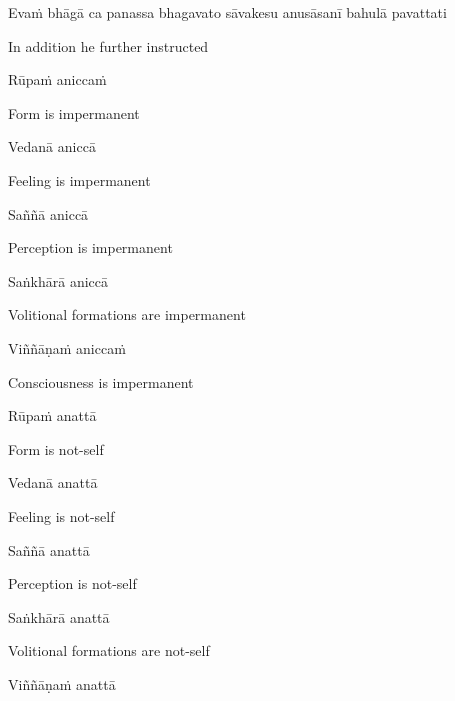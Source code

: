 Evaṁ bhāgā ca panassa bhagavato sāvakesu anusāsanī bahulā pavattati

\begin{english}
  In addition he further instructed
\end{english}

Rūpaṁ aniccaṁ

\begin{english}
  Form is impermanent
\end{english}

Vedanā aniccā

\begin{english}
  Feeling is impermanent
\end{english}

Saññā aniccā

\begin{english}
  Perception is impermanent
\end{english}

Saṅkhārā aniccā

\begin{english}
  Volitional formations are impermanent
\end{english}

Viññāṇaṁ aniccaṁ

\begin{english}
  Consciousness is impermanent
\end{english}

Rūpaṁ anattā

\begin{english}
  Form is not-self
\end{english}

Vedanā anattā

\begin{english}
  Feeling is not-self
\end{english}

Saññā anattā

\begin{english}
  Perception is not-self
\end{english}

Saṅkhārā anattā

\begin{english}
  Volitional formations are not-self
\end{english}

Viññāṇaṁ anattā

